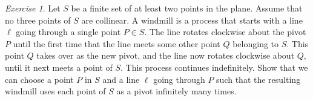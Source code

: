 \documentclass{article}
\theoremstyle{definition}
\theoremstyle{remark}
\newtheorem{exercise}{Exercise}
\begin{document}
\begin{exercise}
Let $S$ be a finite set of at least two points in the plane. Assume that no three points of $S$ are collinear. A windmill is a process that starts with a line $\ell$ going through a single point $P \in S$. The line rotates clockwise about the pivot $P$ until the first time that the line meets some other point $Q$ belonging to $S$. This point $Q$ takes over as the new pivot, and the line now rotates clockwise about $Q$, until it next meets a point of $S$. This process continues indefinitely. Show that we can choose a point $P$ in $S$ and a line $\ell$ going through $P$ such that the resulting windmill uses each point of $S$ as a pivot infinitely many times.
\end{exercise}
\end{document}
